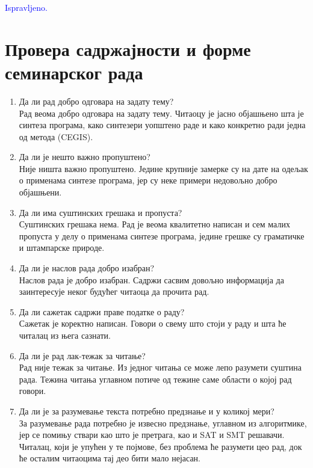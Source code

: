\documentclass[a4paper]{report}
\newcommand{\odgovor}[1]{\textcolor{blue}{#1}}
\begin{document}
\odgovor{Ispravljeno.}


\section{Провера садржајности и форме семинарског рада}

\begin{enumerate}
\item Да ли рад добро одговара на задату тему?\\
Рад веома добро одговара на задату тему. Читаоцу је јасно објашњено шта је синтеза програма, како синтезери уопштено раде и како конкретно ради једна од метода (CEGIS).

\item Да ли је нешто важно пропуштено?\\
Није ништа важно пропуштено. Једине крупније замерке су на дате на одељак о применама синтезе програма, јер су неке примери недовољно добро објашњени.

\item Да ли има суштинских грешака и пропуста?\\
Суштинских грешака нема. Рад је веома квалитетно написан и сем малих пропуста у делу о применама синтезе програма, једине грешке су граматичке и штампарске природе.

\item Да ли је наслов рада добро изабран?\\
Наслов рада је добро изабран. Садржи сасвим довољно информација да заинтересује неког будућег читаоца да прочита рад.

\item Да ли сажетак садржи праве податке о раду?\\
Сажетак је коректно написан. Говори о свему што стоји у раду и шта ће читалац из њега сазнати.

\item Да ли је рад лак-тежак за читање?\\
Рад није тежак за читање. Из једног читања се може лепо разумети суштина рада. Тежина читања углавном потиче од тежине саме области о којој рад говори.

\item Да ли је за разумевање текста потребно предзнање и у коликој мери?\\
За разумевање рада потребно је извесно предзнање, углавном из алгоритмике, јер се помињу ствари као што је претрага, као и SAT и SMT решавачи. Читалац, који је упућен у те појмове, без проблема ће разумети цео рад, док ће осталим читаоцима тај део бити мало нејасан.


\end{enumerate}
\end{document}
